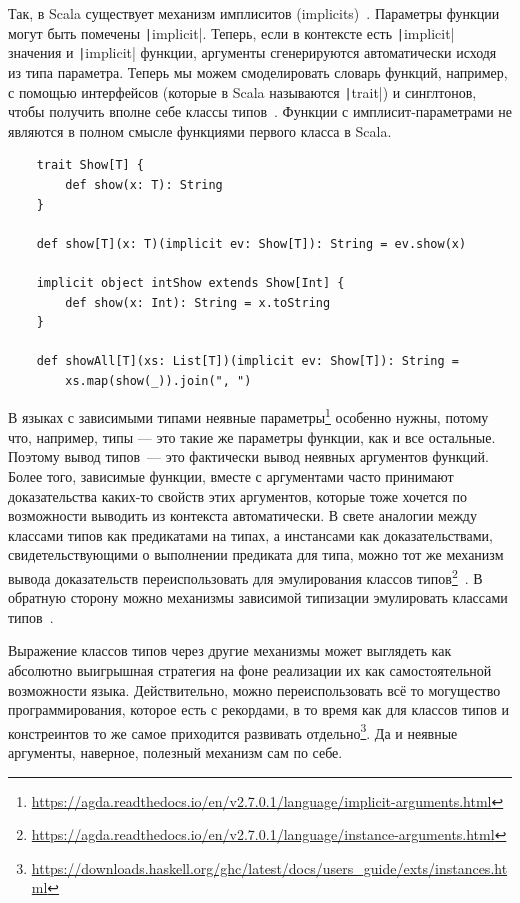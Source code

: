 Так, в Scala существует механизм имплиситов (implicits)~\cite{kvrikava2019scala}.
Параметры функции могут быть помечены \texttt|implicit|.
Теперь, если в контексте есть \texttt|implicit| значения и \texttt|implicit| функции, аргументы сгенерируются автоматически исходя из типа параметра.
Теперь мы можем смоделировать словарь функций, например, с помощью интерфейсов (которые в Scala называются \texttt|trait|) и синглтонов, чтобы получить вполне себе классы типов~\cite{oliveira2010type}.
Функции с имплисит-параметрами не являются в полном смысле функциями первого класса в Scala.
\begin{verbatim}
    trait Show[T] {
        def show(x: T): String
    }

    def show[T](x: T)(implicit ev: Show[T]): String = ev.show(x)

    implicit object intShow extends Show[Int] {
        def show(x: Int): String = x.toString
    }

    def showAll[T](xs: List[T])(implicit ev: Show[T]): String =
        xs.map(show(_)).join(", ")
\end{verbatim}

В языках с зависимыми типами неявные параметры\footnote{\url{https://agda.readthedocs.io/en/v2.7.0.1/language/implicit-arguments.html}} особенно нужны, потому что, например, типы --- это такие же параметры функции, как и все остальные.
Поэтому вывод типов~--- это фактически вывод неявных аргументов функций.
Более того, зависимые функции, вместе с аргументами часто принимают доказательства каких-то свойств этих аргументов, которые тоже хочется по возможности выводить из контекста автоматически.
В свете аналогии между классами типов как предикатами на типах, а инстансами как доказательствами, свидетельствующими о выполнении предиката для типа, можно тот же механизм вывода доказательств переиспользовать для эмулирования классов типов\footnote{\url{https://agda.readthedocs.io/en/v2.7.0.1/language/instance-arguments.html}}~\cite{devriese2011bright}.
В обратную сторону можно механизмы зависимой типизации эмулировать классами типов~\cite{mcbride2002faking}.

Выражение классов типов через другие механизмы может выглядеть как абсолютно выигрышная стратегия на фоне реализации их как самостоятельной возможности языка.
Действительно, можно переиспользовать всё то могущество программирования, которое есть с рекордами, в то время как для классов типов и констреинтов то же самое приходится развивать отдельно\footnote{\url{https://downloads.haskell.org/ghc/latest/docs/users_guide/exts/instances.html}}.
Да и неявные аргументы, наверное, полезный механизм сам по себе.

